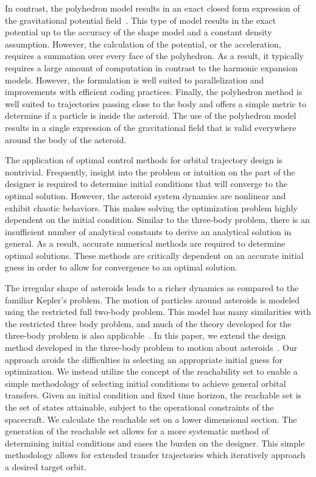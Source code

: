 \documentclass[]{aiaa-tc}%
\begin{document}
In contrast, the polyhedron model results in an exact closed form expression of the gravitational potential field~\cite{werner1994,werner1996}.
This type of model results in the exact potential up to the accuracy of the shape model and a constant density assumption.
However, the calculation of the potential, or the acceleration, requires a summation over every face of the polyhedron. 
As a result, it typically requires a large amount of computation in contrast to the harmonic expansion models. 
However, the formulation is well suited to parallelization and improvements with efficient coding practices. 
Finally, the polyhedron method is well suited to trajectories passing close to the body and offers a simple metric to determine if a particle is inside the asteroid.
The use of the polyhedron model results in a single expression of the gravitational field that is valid everywhere around the body of the asteroid.

The application of optimal control methods for orbital trajectory design is nontrivial.
Frequently, insight into the problem or intuition on the part of the designer is required to determine initial conditions that will converge to the optimal solution.
However, the asteroid system dynamics are nonlinear and exhibit chaotic behaviors.
This makes solving the optimization problem highly dependent on the initial condition.
Similar to the three-body problem, there is an insufficient number of analytical constants to derive an analytical solution in general.
As a result, accurate numerical methods are required to determine optimal solutions.
These methods are critically dependent on an accurate initial guess in order to allow for convergence to an optimal solution.


The irregular shape of asteroids leads to a richer dynamics as compared to the familiar Kepler's problem.
The motion of particles around asteroids is modeled using the restricted full two-body problem.
This model has many similarities with the restricted three body problem, and much of the theory developed for the three-body problem is also applicable~\cite{mondelo2010,herrera2014}.
In this paper, we extend the design method developed in the three-body problem to motion about asteroids~\cite{kulumani2015}.
Our approach avoids the difficulties in selecting an appropriate initial guess for optimization.
We instead utilize the concept of the reachability set to enable a simple methodology of selecting initial conditions to achieve general orbital transfers.
Given an initial condition and fixed time horizon, the reachable set is the set of states attainable, subject to the operational constraints of the spacecraft.
We calculate the reachable set on a lower dimensional \Poincare section. 
The generation of the reachable set allows for a more systematic method of determining initial conditions and eases the burden on the designer.
This simple methodology allows for extended transfer trajectories which iteratively approach a desired target orbit.
\end{document}
